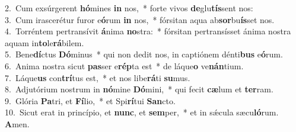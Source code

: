 {2.~}Cum exsúrgerent \textbf{hó}mines \textbf{in} nos,~* forte vivos \textbf{de}glu\textbf{tís}sent nos:\\
{3.~}Cum irascerétur furor e\textbf{ó}rum \textbf{in} nos,~* fórsitan aqua ab\textbf{sor}bu\textbf{ís}set nos.\\
{4.~}Torréntem pertransívit \textbf{á}nima \textbf{no}stra:~* fórsitan pertransísset ánima nostra aquam in\textbf{to}le\textbf{rá}bilem.\\
{5.~}Bene\textbf{dí}ctus \textbf{Dó}minus~* qui non dedit nos, in captiónem dénti\textbf{bus} e\textbf{ó}rum.\\
{6.~}Anima nostra sicut \textbf{pas}ser e\textbf{rép}ta est~* de láque\textbf{o} ve\textbf{nán}tium.\\
{7.~}Láque\textbf{us} con\textbf{trí}tus est,~* et nos libe\textbf{rá}ti \textbf{su}mus.\\
{8.~}Adjutórium nostrum in \textbf{nó}mine \textbf{Dó}mini,~* qui fecit \textbf{cæ}lum et \textbf{ter}ram.\\
{9.~}Glória \textbf{Pa}tri, et \textbf{Fí}lio,~* et Spi\textbf{rí}tui \textbf{San}cto.\\
{10.~}Sicut erat in princípio, et \textbf{nunc}, et \textbf{sem}per,~* et in sǽcula sæcu\textbf{ló}rum. \textbf{A}men.\\
